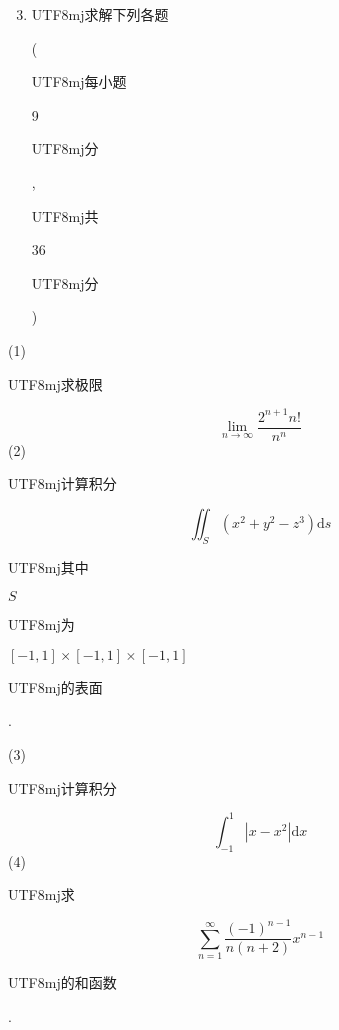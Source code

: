 \documentclass[10pt]{article}
\begin{document}
\begin{enumerate}
  \setcounter{enumi}{2}
  \item \begin{CJK}{UTF8}{mj}求解下列各题\end{CJK} (\begin{CJK}{UTF8}{mj}每小题\end{CJK} 9 \begin{CJK}{UTF8}{mj}分\end{CJK}, \begin{CJK}{UTF8}{mj}共\end{CJK} 36 \begin{CJK}{UTF8}{mj}分\end{CJK})
\end{enumerate}
(1) \begin{CJK}{UTF8}{mj}求极限\end{CJK}
$$
\lim _{n \rightarrow \infty} \frac{2^{n+1} n !}{n^{n}}
$$
(2) \begin{CJK}{UTF8}{mj}计算积分\end{CJK}
$$
\iint_{S}\left(x^{2}+y^{2}-z^{3}\right) \mathrm{d} s
$$
\begin{CJK}{UTF8}{mj}其中\end{CJK} $S$ \begin{CJK}{UTF8}{mj}为\end{CJK} $[-1,1] \times[-1,1] \times[-1,1]$ \begin{CJK}{UTF8}{mj}的表面\end{CJK}.

(3) \begin{CJK}{UTF8}{mj}计算积分\end{CJK}
$$
\int_{-1}^{1}\left|x-x^{2}\right| \mathrm{d} x
$$
(4) \begin{CJK}{UTF8}{mj}求\end{CJK}
$$
\sum_{n=1}^{\infty} \frac{(-1)^{n-1}}{n(n+2)} x^{n-1}
$$
\begin{CJK}{UTF8}{mj}的和函数\end{CJK}.
\end{document}

